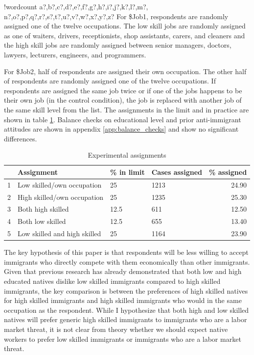 \documentclass{article}\usepackage[]{graphicx}\usepackage[]{color}
\newcounter{words}
\newenvironment{counted}{%
\setcounter{words}{0}
\SearchList!{wordcount}{\stepcounter{words}}
{a?,b?,c?,d?,e?,f?,g?,h?,i?,j?,k?,l?,m?,
n?,o?,p?,q?,r?,s?,t?,u?,v?,w?,x?,y?,z?}
\UndoBoundary{'}
\SearchOrder{p;}}{%
\StopSearching}
\begin{document}
\begin{counted}
For \$Job1, respondents are randomly assigned one of the twelve occupations. The low skill jobs are randomly assigned as one of waiters, drivers, receptionists, shop assistants, carers, and cleaners and the high skill jobs are randomly assigned between senior managers, doctors, lawyers, lecturers, engineers, and programmers.

For \$Job2, half of respondents are assigned their own occupation. The other half of respondents are randomly assigned one of the twelve occupations. If respondents are assigned the same job twice or if one of the jobs happens to be their own job (in the control condition), the job is replaced with another job of the same skill level from the list. The assignments in the limit and in practice are shown in table \ref{table:assignment}. Balance checks on educational level and prior anti-immigrant attitudes are shown in appendix \ref{app:balance_checks} and show no significant differences.


\begin{table}[ht]
\centering
\begin{tabular}{rlllr}
  \hline
 & Assignment & \% in limit & Cases assigned & \% assigned \\ 
  \hline
1 & Low skilled/own occupation & 25 & 1213 & 24.90 \\ 
  2 & High skilled/own occupation & 25 & 1235 & 25.30 \\ 
  3 & Both high skilled & 12.5 & 611 & 12.50 \\ 
  4 & Both low skilled & 12.5 & 655 & 13.40 \\ 
  5 & Low skilled and high skilled & 25 & 1164 & 23.90 \\ 
   \hline
\end{tabular}
\caption{Experimental assignments} 
\label{table:assignment}
\end{table}


The key hypothesis of this paper is that respondents will be less willing to accept immigrants who directly compete with them economically than other immigrants. Given that previous research has already demonstrated that both low and high educated natives dislike low skilled immigrants compared to high skilled immigrants, the key comparison is between the preferences of high skilled natives for high skilled immigrants and high skilled immigrants who would in the same occupation as the respondent. While I hypothesize that both high and low skilled natives will prefer generic high skilled immigrants to immigrants who are a labor market threat, it is not clear from theory whether we should expect native workers to prefer low skilled immigrants or immigrants who are a labor market threat.


\end{counted}
\end{document}
